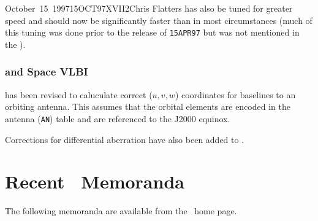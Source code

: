 \documentclass[twoside]{article}
\begin{document}
\begin{aipsletter}{October~15~1997}{15OCT97}{XVII}{2}{Chris Flatters}
 has also be tuned for greater speed and should now be
significantly faster than  in most circumstances (much of
this tuning was done prior to the release of \texttt{15APR97} but was
not mentioned in the \AIPSLetter).

\subsubsection{ and Space VLBI}

 has been revised to caluculate correct ($u, v, w$)
coordinates for baselines to an orbiting antenna.  This assumes that
the orbital elements are encoded in the antenna (\texttt{AN}) table
and are referenced to the J2000 equinox.

Corrections for differential aberration have also been added to
.


\vfill
\section{Recent \AIPS\ Memoranda}

The following memoranda are available from the \AIPS\ home page.


\end{aipsletter}
\end{document}
